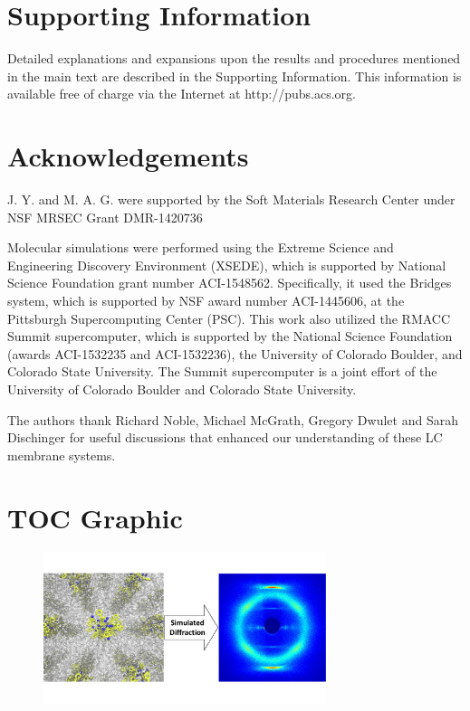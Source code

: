 \documentclass[journal=jpcbfk,manuscript=article]{achemso}
\begin{document}
  \section*{Supporting Information}
  
  Detailed explanations and expansions upon the results and procedures mentioned in 
  the main text are described in the Supporting Information. This information is 
  available free of charge via the Internet at http://pubs.acs.org.

  \section*{Acknowledgements}

  J. Y. and M. A. G. were supported by the Soft Materials Research Center under NSF 
  MRSEC Grant DMR-1420736

  Molecular simulations were performed using the Extreme Science and
  Engineering Discovery Environment (XSEDE), which is supported by National
  Science Foundation grant number ACI-1548562. Specifically, it used the Bridges
  system, which is supported by NSF award number ACI-1445606, at the Pittsburgh
  Supercomputing Center (PSC). This work also utilized the RMACC Summit supercomputer,
  which is supported by the National Science Foundation (awards ACI-1532235 and
  ACI-1532236), the University of Colorado Boulder, and Colorado State
  University. The Summit supercomputer is a joint effort of the University of
  Colorado Boulder and Colorado State University.

  The authors thank Richard Noble, Michael McGrath, Gregory Dwulet and Sarah Dischinger
  for useful discussions that enhanced our understanding of these LC membrane systems. 

  \clearpage
  
  
  \newpage
  
  \section*{TOC Graphic}
  \begin{figure}
  \includegraphics[width=3.25in]{new_toc_graphic.pdf}
 \end{figure}
\end{document}
